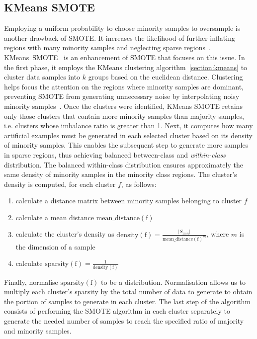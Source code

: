 \subsection{KMeans SMOTE}
\label{subsection:kmeans-smote}

Employing a uniform probability to choose minority samples to oversample is another drawback of
SMOTE. It increases the likelihood of further inflating regions with many minority samples and
neglecting sparse regions~\cite{kmeans-smote}. KMeans~SMOTE~\cite{kmeans-smote} is an enhancement
of SMOTE that focuses on this issue. In the first phase, it employs the KMeans clustering
algorithm~\ref{section:kmeans} to cluster data samples into $k$ groups based on the euclidean
distance. Clustering helps focus the attention on the regions where minority samples are dominant,
preventing SMOTE from generating unnecessary noise by interpolating noisy minority
samples~\cite{kmeans-smote}. Once the clusters were identified, KMeans SMOTE retains only those
clusters that contain more minority samples than majority samples, i.e. clusters whose imbalance
ratio is greater than 1. Next, it computes how many artificial examples must be generated in each
selected cluster based on its density of minority samples. This enables the subsequent step to
generate more samples in sparse regions, thus achieving balanced between-class and
\emph{within-class} distribution. The balanced within-class distribution ensures approximately the
same density of minority samples in the minority class regions. The cluster's density is computed,
for each cluster $f$, as follows:

\begin{enumerate}
    \item calculate a distance matrix between minority samples belonging to cluster $f$
    \item calculate a mean distance $\mathrm{mean\_distance(f)}$
    \item calculate the cluster's density as $\mathrm{density(f)} = \frac{\lvert S_{min}
        \rvert}{\mathrm{mean\_distance(f)}^m}$, where $m$ is the dimension of a sample
    \item calculate $\mathrm{sparsity(f)} = \frac{1}{\mathrm{density(f)}}$
\end{enumerate}

Finally, normalise $\mathrm{sparsity(f)}$ to be a distribution. Normalisation allows us to multiply
each cluster's sparsity by the total number of data to generate to obtain the portion of samples to
generate in each cluster. The last step of the algorithm consists of performing the SMOTE algorithm
in each cluster separately to generate the needed number of samples to reach the specified ratio of
majority and minority samples.

